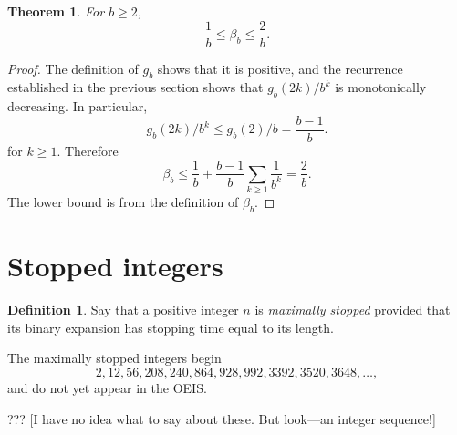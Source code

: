 \documentclass[12pt]{amsart}
\newtheorem{theorem}{Theorem}
\theoremstyle{definition}
\newtheorem{definition}{Definition}
\begin{document}
\begin{theorem}
    For $b \geq 2$,
    \begin{equation*}
        \frac{1}{b} \leq \beta_b \leq \frac{2}{b}.
    \end{equation*}
\end{theorem}

\begin{proof}
    The definition of $g_b$ shows that it is positive, and the recurrence
    established in the previous section shows that $g_b(2k) / b^k$ is
    monotonically decreasing. In particular,
    \begin{equation*}
        g_b(2k) / b^k \leq g_b(2) / b = \frac{b - 1}{b}.
    \end{equation*}
    for $k \geq 1$. Therefore
    \begin{equation*}
        \beta_b \leq \frac{1}{b} + \frac{b - 1}{b} \sum_{k \geq 1} \frac{1}{b^k}
        = \frac{2}{b}.
    \end{equation*}
    The lower bound is from the definition of $\beta_b$.
\end{proof}

\section{Stopped integers}
\label{sec:stopped_integers}

\begin{definition}
    Say that a positive integer $n$ is \emph{maximally stopped} provided that
    its binary expansion has stopping time equal to its length.
\end{definition}

The maximally stopped integers begin
\begin{equation*}
    2, 12, 56, 208, 240, 864, 928, 992, 3392, 3520, 3648, \dots,
\end{equation*}
and do not yet appear in the OEIS.

??? [I have no idea what to say about these. But look---an integer sequence!]
\end{document}

